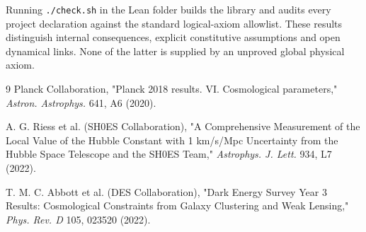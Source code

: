 \documentclass[aps,prd,twocolumn,showpacs,superscriptaddress,groupedaddress,nofootinbib,english,floatfix]{revtex4-2}
\begin{document}
Running \texttt{./check.sh} in the Lean folder builds the library and audits every project declaration against the standard logical-axiom allowlist. These results distinguish internal consequences, explicit constitutive assumptions and open dynamical links. None of the latter is supplied by an unproved global physical axiom.


\begin{thebibliography}{9}
    Planck Collaboration, "Planck 2018 results. VI. Cosmological parameters," \textit{Astron. Astrophys.} 641, A6 (2020).
    
    A. G. Riess et al. (SH0ES Collaboration), "A Comprehensive Measurement of the Local Value of the Hubble Constant with 1 km/s/Mpc Uncertainty from the Hubble Space Telescope and the SH0ES Team," \textit{Astrophys. J. Lett.} 934, L7 (2022).
    
    T. M. C. Abbott et al. (DES Collaboration), "Dark Energy Survey Year 3 Results: Cosmological Constraints from Galaxy Clustering and Weak Lensing," \textit{Phys. Rev. D} 105, 023520 (2022).
\end{thebibliography}
\end{document}
